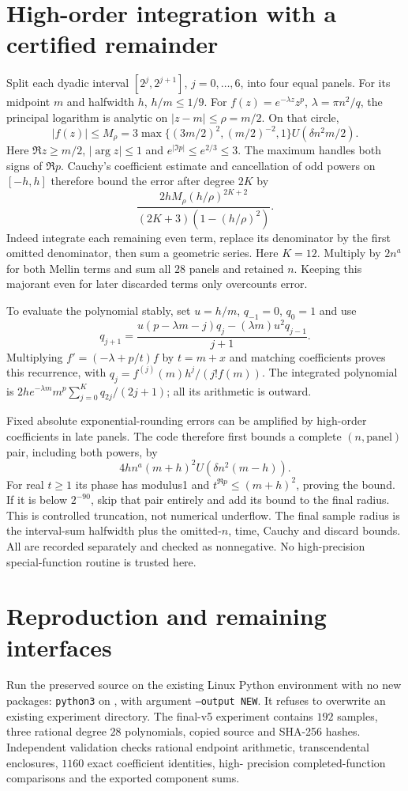 \documentclass[11pt]{article}
\theoremstyle{definition}\newtheorem{definition}[theorem]{Definition}
\theoremstyle{remark}\newtheorem{remark}[theorem]{Remark}
\begin{document}
\section{High-order integration with a certified remainder}
Split each dyadic interval $[2^j,2^{j+1}]$, $j=0,\ldots,6$, into four equal
panels. For its midpoint $m$ and halfwidth $h$, $h/m\le1/9$.
For $f(z)=e^{-\lambda z}z^p$, $\lambda=\pi n^2/q$, the principal logarithm
is analytic on $|z-m|\le\rho=m/2$. On that circle,
\[
 |f(z)|\le M_\rho=3\max\{(3m/2)^2,(m/2)^{-2},1\}
 U(\delta n^2m/2).
\]
Here $\Re z\ge m/2$, $|\arg z|\le1$ and
$e^{|\Im p|}\le e^{2/3}\le3$. The maximum handles both signs of $\Re p$.
Cauchy's coefficient estimate and cancellation of odd powers on $[-h,h]$
therefore bound the error after degree $2K$ by
\[
 \frac{2hM_\rho(h/\rho)^{2K+2}}
 {(2K+3)(1-(h/\rho)^2)}.
\]
Indeed integrate each remaining even term, replace its denominator by the
first omitted denominator, then sum a geometric series. Here $K=12$.
Multiply by $2n^a$ for both Mellin terms and sum all $28$ panels and retained $n$.
Keeping this majorant even for later discarded terms only overcounts error.

To evaluate the polynomial stably, set $u=h/m$, $q_{-1}=0$, $q_0=1$ and use
\[
 q_{j+1}=\frac{u(p-\lambda m-j)q_j-(\lambda m)u^2q_{j-1}}{j+1}.
\]
Multiplying $f'=(-\lambda+p/t)f$ by $t=m+x$ and matching coefficients proves
this recurrence, with $q_j=f^{(j)}(m)h^j/(j!f(m))$. The integrated polynomial is
$2he^{-\lambda m}m^p\sum_{j=0}^{K}q_{2j}/(2j+1)$; all its arithmetic is outward.

Fixed absolute exponential-rounding errors can be amplified by high-order
coefficients in late panels. The code therefore first bounds a complete
$(n,\text{panel})$ pair, including both powers, by
\[
 4hn^a(m+h)^2U(\delta n^2(m-h)).
\]
For real $t\ge1$ its phase has modulus1 and $t^{\Re p}\le(m+h)^2$, proving
the bound. If it is below $2^{-90}$, skip that pair entirely and add its bound
to the final radius. This is controlled truncation, not numerical underflow.
The final sample radius is the interval-sum halfwidth plus the omitted-$n$,
time, Cauchy and discard bounds. All are recorded separately and checked as
nonnegative. No high-precision special-function routine is trusted here.

\section{Reproduction and remaining interfaces}
Run the preserved source on the existing Linux Python environment with no new
packages: \texttt{python3} on , with argument \texttt{--output NEW}.
It refuses to overwrite an existing experiment directory. The final-v5
experiment contains $192$ samples, three rational degree $28$ polynomials, copied
source and SHA-256 hashes. Independent validation checks rational endpoint
arithmetic, transcendental enclosures, $1160$ exact coefficient identities, high-
precision completed-function comparisons and the exported component sums.
\end{document}
